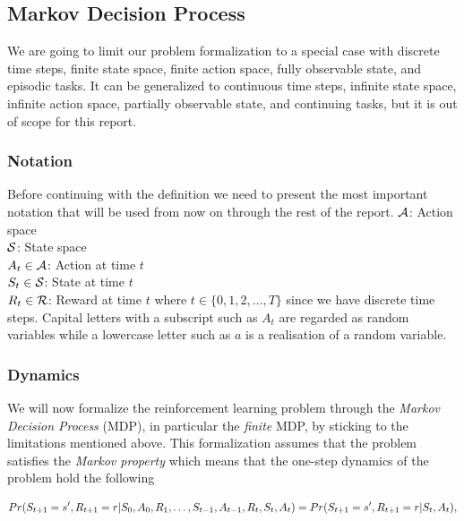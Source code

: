 \documentclass[result.tex]{subfiles}
\begin{document}
    \subsection*{Markov Decision Process}

    We are going to limit our problem formalization to a special case with discrete time steps, finite state space, finite action space, fully observable state, and episodic tasks. It can be generalized to continuous time steps, infinite state space, infinite action space, partially observable state, and continuing tasks, but it is out of scope for this report.

    \subsubsection*{Notation}

    Before continuing with the definition we need to present the most important notation that will be used from now on through the rest of the report.
    \newline
    $\mathcal{A}$: Action space \\
    $\mathcal{S}$: State space \\
    $A_t \in \mathcal{A}$: Action at time $t$ \\
    $S_t \in \mathcal{S}$: State at time $t$ \\
    $R_t \in \mathcal{R}$: Reward at time $t$
    \newline
    where $t \in \{ 0, 1, 2, \ldots, T \}$ since we have discrete time steps. Capital letters with a subscript such as $A_t$ are regarded as random variables while a lowercase letter such as $a$ is a realisation of a random variable.

    \subsubsection*{Dynamics}

    We will now formalize the reinforcement learning problem through the \textit{Markov Decision Process} (MDP), in particular the \textit{finite} MDP, by sticking to the limitations mentioned above. This formalization assumes that the problem satisfies the \textit{Markov property} which means that the one-step dynamics of the problem hold the following

    \begin{align*}
        Pr(S_{t + 1} = s^\prime, R_{t + 1} = r | S_0, A_0, R_1, \ldots, S_{t - 1}, A_{t - 1}, R_t, S_t, A_t) = Pr(S_{t + 1} = s^\prime, R_{t + 1} = r | S_t, A_t),
    \end{align*}
\end{document}
